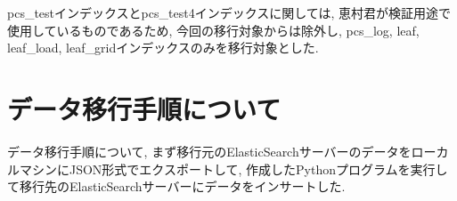 

pcs\_testインデックスとpcs\_test4インデックスに関しては, 恵村君が検証用途で使用しているものであるため, 今回の移行対象からは除外し, pcs\_log, leaf, leaf\_load, leaf\_gridインデックスのみを移行対象とした.

\section{データ移行手順について}

データ移行手順について, まず移行元のElasticSearchサーバーのデータをローカルマシンにJSON形式でエクスポートして, 作成したPythonプログラムを実行して移行先のElasticSearchサーバーにデータをインサートした.

